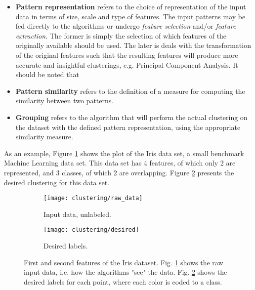 \begin{itemize}
    \item \textbf{Pattern representation} refers to the choice of representation of the input data in terms of size, scale and type of features.
    The input patterns may be fed directly to the algorithms or undergo \emph{feature selection} and/or \emph{feature extraction}. The former is simply the selection of which features of the originally available should be used.
    The later is deals with the transformation of the original features such that the resulting features will produce more accurate and insightful clusterings, e.g. Principal Component Analysis.
    It should be noted that 
    \item \textbf{Pattern similarity} refers to the definition of a measure for computing the similarity between two patterns.
    \item \textbf{Grouping} refers to the algorithm that will perform the actual clustering on the dataset with the defined pattern representation, using the appropriate similarity measure.
\end{itemize}

As an example, Figure \ref{fig:intro raw} shows the plot of the Iris data set, a small benchmark Machine Learning data set.
This data set has 4 features, of which only 2 are represented, and 3 classes, of which 2 are overlapping.
Figure \ref{fig:intro natural} presents the desired clustering for this data set.


\begin{figure}[!ht]
    \centering
    \begin{subfigure}[b]{0.45\textwidth}
        \centering
        \texttt{[image: clustering/raw\_data]}
        \caption{Input data, unlabeled.}
        \label{fig:intro raw}
    \end{subfigure}
    \begin{subfigure}[b]{0.45\textwidth}
        \centering
        \texttt{[image: clustering/desired]}
        \caption{Desired labels.}
        \label{fig:intro natural}
    \end{subfigure}

    \caption{First and second features of the Iris dataset. Fig. \ref{fig:intro raw} shows the raw input data, i.e. how the algorithms "see" the data. Fig. \ref{fig:intro natural} shows the desired labels for each point, where each color is coded to a class.}
    \label{fig:clustering plots}
\end{figure}


